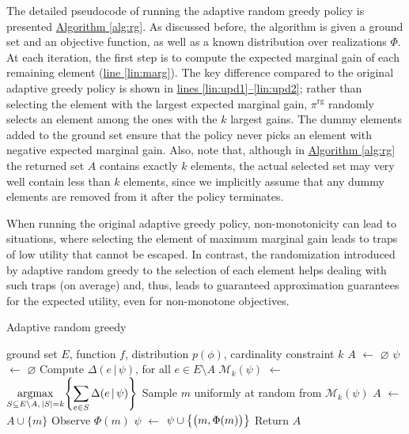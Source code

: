 \documentclass{article}
\newcommand{\algoref}[1]{\hyperref[#1]{Algorithm \ref*{#1}}}
\newcommand{\lineref}[1]{\hyperref[#1]{line \ref*{#1}}}
\newcommand{\linesref}[2]{\hyperref[#1]{lines \ref*{#1}--\ref*{#2}}}
\newcommand*\LET[2]{\STATE #1 $\gets$ #2}
\newcommand{\argmax}{\operatornamewithlimits{argmax}}
\let\originalleft\left
\let\originalright\right
\renewcommand{\left}{\mathopen{}\mathclose\bgroup\originalleft}
\renewcommand{\right}{\aftergroup\egroup\originalright}
\newcommand{\mmid}{\,\vert\,}
\newcommand{\D}[2]{\Delta(#1\mmid#2)}
\newcommand{\pig}{\pi^{\textrm{rg}}}
\newcommand{\Mk}{\mathcal{M}_k}
\begin{document}
The detailed pseudocode of running the adaptive random greedy policy is presented \algoref{alg:rg}.
As discussed before, the algorithm is given a ground set and an objective function, as well as a known distribution over realizations $\Phi$.
At each iteration, the first step is to compute the expected marginal gain of each remaining element (\lineref{lin:marg}).
The key difference compared to the original adaptive greedy policy is shown in \linesref{lin:upd1}{lin:upd2}; rather than selecting the element with the largest expected marginal gain, $\pig$ randomly selects an element among the ones with the $k$ largest gains.
The dummy elements added to the ground set ensure that the policy never picks an element with negative expected marginal gain.
Also, note that, although in \algoref{alg:rg} the returned set $A$ contains exactly $k$ elements, the actual selected set may very well contain less than $k$ elements, since we implicitly assume that any dummy elements are removed from it after the policy terminates.

When running the original adaptive greedy policy, non-monotonicity can lead to situations, where selecting the element of maximum marginal gain leads to traps of low utility that cannot be escaped.
In contrast, the randomization introduced by adaptive random greedy to the selection of each element helps dealing with such traps (on average) and, thus, leads to guaranteed approximation guarantees for the expected utility, even for non-monotone objectives.

\begin{algorithm}[tb]
  \caption{Adaptive random greedy}
  \label{alg:rg}
  \small{
    \begin{algorithmic}[1]
      \REQUIRE ground set $E$, function $f$, distribution $p(\phi)$, cardinality constraint $k$
      \LET{$A$}{$\varnothing$}
      \LET{$\psi$}{$\varnothing$}
      \STATE Compute $\D{e}{\psi}$, for all $e \in E \setminus A$ \label{lin:marg}
      \LET{$\Mk(\psi)$}{$\displaystyle\argmax_{S \subseteq E \setminus A,\,|S| = k}\left\{\sum_{e \in S} \D{e}{\psi} \right\}$} \label{lin:upd1}
      \STATE Sample $m$ uniformly at random from $\Mk(\psi)$ \label{lin:upd2}
      \LET{$A$}{$A \cup \{m\}$}
      \STATE Observe $\Phi(m)$
      \LET{$\psi$}{$\psi \cup \left\{\big(m, \Phi(m)\big)\right\}$}
      \ENDFOR
      \STATE Return $A$
    \end{algorithmic}
  }
\end{algorithm}
\end{document}
